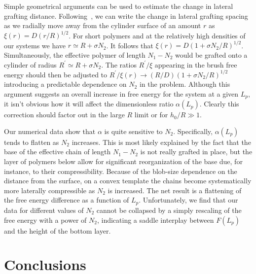 Simple geometrical arguments can be used to estimate the change in lateral grafting distance.
Following~\cite{LipowskyPB}, we can write the change in lateral grafting  spacing
as we radially move away from the cylinder surface of an amount $r$ as $\xi(r)=D (r/R)^{1/2}$. 
For short polymers and 
at the relatively high densities of our systems we have $r\simeq R+\sigma N_2$. It follows that
$\xi(r)=D (1+\sigma N_2/R)^{1/2}$. Simultaneously, the effective polymer of length $N_1-N_2$ 
would be grafted onto a cylinder of radius $R^\prime\simeq R+\sigma N_2$. The ratios $R^\prime/\xi$
appearing in the brush free energy should then be adjusted to
 $R^\prime/ \xi(r) \rightarrow (R/D) (1+\sigma N_2/R)^{1/2}$  introducing a predictable dependence on $N_2$
 in the problem. Although this argument suggests an overall increase in free energy for the system at a given $L_p$, 
 it isn't obvious how it will affect the dimensionless ratio $\alpha (L_p)$. Clearly this correction should factor out in the large $R$ limit or for $h_0/R\gg1$.
 
Our numerical data show that $\alpha$ is quite sensitive to $N_2$. Specifically,  
$\alpha(L_p)$ tends to flatten as $N_2$ increases. 
This is most likely explained by the fact that the base of the effective chain of length $N_1-N_2$
is not really grafted in place, but the layer of polymers below allow for significant reorganization of the base
due, for instance, to their compressibility. Because of the blob-size dependence
on the distance from the surface, on a convex template the chains become systematically more laterally compressible
as $N_2$ is increased. 
The net result is a flattening of the free energy difference as a function of $L_p$.
Unfortunately, we find that our data for different values of $N_2$
cannot be collapsed by a simply rescaling of the free energy with a power of $N_2$,
indicating a saddle interplay between $F(L_p)$ and the height of the bottom layer.

\section{Conclusions}

